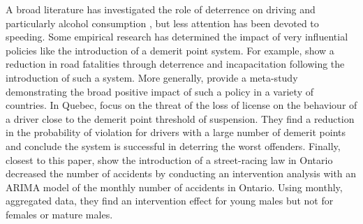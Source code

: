 
A broad literature has investigated the role of deterrence on driving 
and particularly alcohol consumption 
\citep[e.g.][]{hansen2015}, 
but less attention has been devoted to speeding. 
Some empirical research has determined the impact of very influential policies 
like the introduction of a demerit point system. 
For example, 
\citet{bennedittiniNicita2009} 
show a reduction in road fatalities 
through deterrence and incapacitation following the introduction of such a system. 
More generally, 
\citet{castillocastro2012} 
provide a meta-study 
demonstrating the broad positive impact of such a policy in a variety of countries. 
In Quebec, 
\citet{dionneetal2011} 
focus on the threat of the loss of license 
on the behaviour of a driver close to the demerit point threshold of suspension. 
They find a reduction in the probability of violation for drivers 
with a large number of demerit points and conclude 
the system is successful in deterring the worst offenders. 
Finally, closest to this paper, 
\citet{meirambayeva2014} 
show the introduction of a street-racing law in Ontario decreased the number of accidents 
by conducting an intervention analysis with an ARIMA model of 
the monthly number of accidents in Ontario.
% 
%
% 
%
Using monthly, aggregated data, 
they find an intervention effect for young males
but not for females or mature males. 


